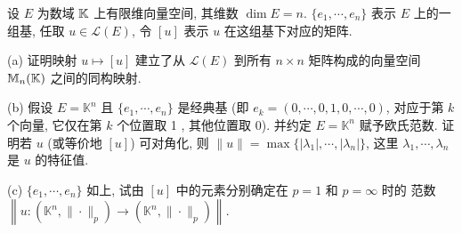 \begin{exercise}
    设 $E$ 为数域 $\mathbb{K}$ 上有限维向量空间, 其维数 $\dim E=n$.
    $\{e_{1},\cdots,e_{n}\}$ 表示 $E$ 上的一组基, 任取 $u\in\mathcal{L}(E)$, 令 $[u]$ 表示 $u$ 在这组基下对应的矩阵.

    (a) 证明映射 $u \mapsto[u]$ 建立了从 $\mathcal{L}(E)$ 到所有 $n \times n$ 矩阵构成的向量空间 
    $\mathbb{M}_{n}(\mathbb{K})$ 之间的同构映射.

    (b) 假设 $E=\mathbb{K}^{n}$ 且 $\{e_1,\cdots,e_n\}$ 是经典基 
    (即 $e_{k}=(0, \cdots, 0,1,0, \cdots, 0)$, 对应于第 $k$ 个向量, 
    它仅在第 $k$ 个位置取 1 , 其他位置取 $0$). 
    并约定 $E=\mathbb{K}^{n}$ 赋予欧氏范数. 证明若 $u$ (或等价地 $[u]$) 可对角化, 
    则 $\|u\|=\max\{|\lambda_{1}|,\cdots,|\lambda_{n}|\}$, 这里 $\lambda_{1}, \cdots, \lambda_{n}$ 是 $u$ 的特征值.

    (c) $\{e_{1}, \cdots, e_{n}\}$ 如上, 试由 $[u]$ 中的元素分别确定在 $p=1$ 和 $p=\infty$ 时的
    范数 $\left\|u:\left(\mathbb{K}^{n},\|\cdot\|_{p}\right)\rightarrow\left(\mathbb{K}^{n},\|\cdot\|_{p}\right)\right\|$.
\end{exercise}

